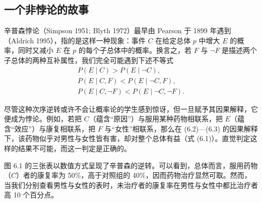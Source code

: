 \subsection{一个非悖论的故事}

辛普森悖论（Simpson 1951; Blyth 1972）最早由 Pearson 于 1899 年遇到（Aldrich 1995），指的是这样一种现象：事件 $C$ 在给定总体 $p$ 中增大 $E$ 的概率，同时又减小 $E$ 在 $p$ 的每个子总体中的概率。换言之，若 $F$ 与 $\neg F$ 是描述两个子总体的两种互补属性，我们完全可能遇到下述不等式
\begin{gather}
P(E\mid C) > P(E\mid \neg C), \tag{6.1}\\
P(E\mid C,F) < P(E\mid \neg C,F), \tag{6.2}\\
P(E\mid C,\neg F) < P(E\mid \neg C,\neg F). \tag{6.3}
\end{gather}

尽管这种次序逆转或许不会让概率论的学生感到惊讶，但一旦赋予其因果解释，它便成为悖论。例如，若把 $C$（蕴含“原因”）与服用某种药物相联系，把 $E$（蕴含“效应”）与康复相联系，把 $F$ 与“女性”相联系，那么在 \textup{(6.2)}—\textup{(6.3)} 的因果解释下，该药物似乎对男性与女性皆有害，却对整个总体有益（式 \textup{(6.1)}）。直觉判定这样的结果不可能，而这一判定是正确的。

图 6.1 的三张表以数值方式呈现了辛普森的逆转。可以看到，总体而言，服用药物（$C$）者的康复率为 50\%，高于对照组的 40\%，因而药物治疗显然可取。然而，当我们分别查看男性与女性的表时，未治疗者的康复率在男性与女性中都比治疗者高 10 个百分点。

